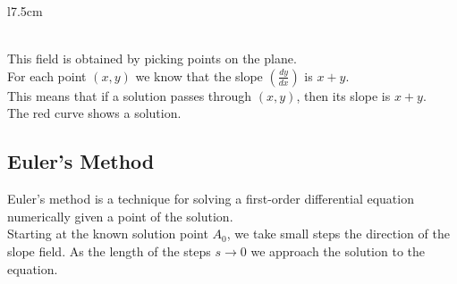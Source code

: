 \documentclass{article}
\begin{document}
\begin{wrapfigure}{l}{7.5cm}
\end{wrapfigure}

\phantom{ } \\

This field is obtained by picking points on the plane. \\
For each point \((x,y)\) we know that the slope \((\frac{dy}{dx})\)
is \(x + y\). \\
This means that if a solution passes through \((x,y)\), then its slope is \(x+y\). \\
The red curve shows a solution.

\wrapfill

\subsection{Euler's Method}

Euler's method is a technique for solving a 
first-order differential equation numerically given a point of the solution.
\\
Starting at the known solution point \(A_0\), we take small steps the direction
of the slope field. As the length of the steps \(s \to 0\)
we approach the solution to the equation. \\
\end{document}
